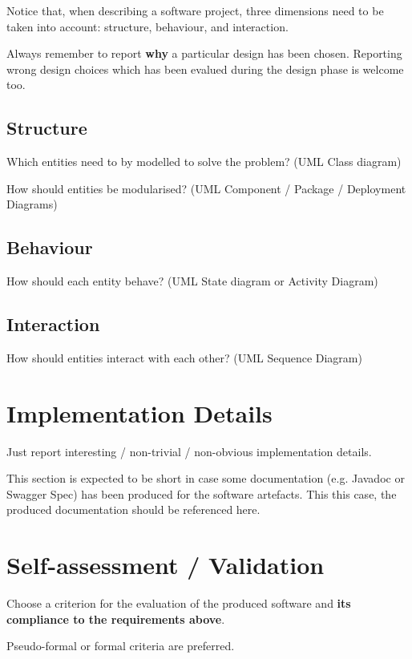 \documentclass{scrartcl}
\begin{document}
Notice that, when describing a software project, three dimensions need to be taken into account: structure, behaviour, and interaction.

Always remember to report \textbf{why} a particular design has been chosen.
Reporting wrong design choices which has been evalued during the design phase is welcome too.

\subsection{Structure}

Which entities need to by modelled to solve the problem?
%
(UML Class diagram)

How should entities be modularised?
%
(UML Component / Package / Deployment Diagrams)

\subsection{Behaviour}

How should each entity behave?
%
(UML State diagram or Activity Diagram)

\subsection{Interaction}

How should entities interact with each other?
%
(UML Sequence Diagram)

\section{Implementation Details}

Just report interesting / non-trivial / non-obvious implementation details.

This section is expected to be short in case some documentation (e.g. Javadoc or Swagger Spec) has been produced for the software artefacts.
%
This this case, the produced documentation should be referenced here.

\section{Self-assessment / Validation}

Choose a criterion for the evaluation of the produced software and \textbf{its compliance to the requirements above}.

Pseudo-formal or formal criteria are preferred.
\end{document}
